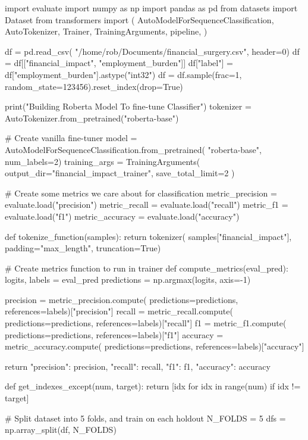 \begin{python}

import evaluate
import numpy as np
import pandas as pd
from datasets import Dataset
from transformers import (
    AutoModelForSequenceClassification,
    AutoTokenizer,
    Trainer,
    TrainingArguments,
    pipeline,
)

df = pd.read_csv(
    "/home/rob/Documents/financial_surgery.csv",
    header=0)
df = df[["financial_impact", "employment_burden"]]
df["label"] = df["employment_burden"].astype("int32")
df = df.sample(frac=1,
    random_state=123456).reset_index(drop=True)

print("Building Roberta Model To fine-tune Classifier")
tokenizer = AutoTokenizer.from_pretrained("roberta-base")

# Create vanilla fine-tuner
model = AutoModelForSequenceClassification.from_pretrained(
    "roberta-base", num_labels=2)
training_args = TrainingArguments(
    output_dir="financial_impact_trainer",
    save_total_limit=2
)

# Create some metrics we care about for classification
metric_precision = evaluate.load("precision")
metric_recall = evaluate.load("recall")
metric_f1 = evaluate.load("f1")
metric_accuracy = evaluate.load("accuracy")


def tokenize_function(samples):
    return tokenizer(
        samples["financial_impact"],
        padding="max_length",
        truncation=True)

# Create metrics function to run in trainer
def compute_metrics(eval_pred):
    logits, labels = eval_pred
    predictions = np.argmax(logits, axis=-1)

    precision = metric_precision.compute(
        predictions=predictions,
        references=labels)["precision"]
    recall = metric_recall.compute(
        predictions=predictions,
        references=labels)["recall"]
    f1 = metric_f1.compute(
        predictions=predictions,
        references=labels)["f1"]
    accuracy = metric_accuracy.compute(
        predictions=predictions,
        references=labels)["accuracy"]

    return {
        "precision": precision,
        "recall": recall,
        "f1": f1,
        "accuracy": accuracy
    }


def get_indexes_except(num, target):
    return [idx for idx in range(num) if idx != target]

# Split dataset into 5 folds, and train on each holdout
N_FOLDS = 5
dfs = np.array_split(df, N_FOLDS)


\end{python}
